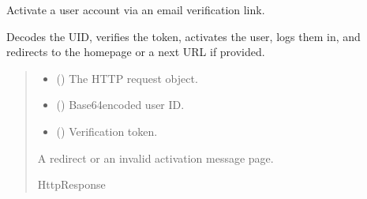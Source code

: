 \documentclass[letterpaper,10pt,english]{sphinxmanual}
\begin{document}

\begin{fulllineitems}
\label{\detokenize{users:users.views.activate}}
\pysigstartsignatures
\pysiglinewithargsret
{}
{\sphinxparamcomma {}\sphinxparamcomma {}}
{}
\pysigstopsignatures
\sphinxAtStartPar
Activate a user account via an email verification link.

\sphinxAtStartPar
Decodes the UID, verifies the token, activates the user, logs them in,
and redirects to the homepage or a next URL if provided.
\begin{quote}\begin{description}
\begin{itemize}
\item {} 
\sphinxAtStartPar
{} () \textendash{} The HTTP request object.

\item {} 
\sphinxAtStartPar
{} () \textendash{} Base64\sphinxhyphen{}encoded user ID.

\item {} 
\sphinxAtStartPar
{} () \textendash{} Verification token.

\end{itemize}

\sphinxAtStartPar
A redirect or an invalid activation message page.

\sphinxAtStartPar
HttpResponse

\end{description}\end{quote}

\end{fulllineitems}

\end{document}
